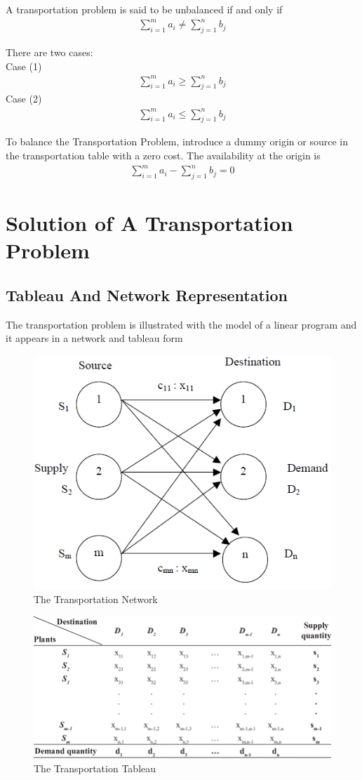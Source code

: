 \documentclass[12pt]{report}
\newcommand{\NI}{\noindent}
\newcommand{\tp}{Transportation Problem }
\newcommand{\stp}{transportation problem }
\begin{document}
	\NI A \stp is said to be unbalanced if and only if
	\begin{eqnarray}
		\sum_{i=1}^{m}a_i \neq \sum_{j=1}^{n}b_j\label{eq:3_5}
	\end{eqnarray} 
	
	\NI There are two cases:\\
	Case (1)
	\begin{eqnarray}
		\sum_{i=1}^{m}a_i \geq \sum_{j=1}^{n}b_j\label{eq:3_6}
	\end{eqnarray}
	Case (2)
	\begin{eqnarray}
		\sum_{i=1}^{m}a_i \leq \sum_{j=1}^{n}b_j\label{eq:3_7}
	\end{eqnarray}
	
	\NI To balance the Transportation Problem, introduce a dummy origin or source in the transportation table with a zero cost. The availability at the origin is
	\begin{eqnarray}
		\sum_{i=1}^{m}a_i - \sum_{j=1}^{n}b_j = 0 \label{eq:3_8}
	\end{eqnarray}
	
	\section{Solution of A \tp}
	\subsection{Tableau And Network Representation}
	The \stp is illustrated with the model of a linear program and it appears in a network and tableau form
	
	\begin{figure}[!h]
		\centering
		\includegraphics[width=0.62\linewidth]{tt}
		\caption{The Transportation Network}
		\label{fg:3_1}
	\end{figure}
	\begin{figure}[!h]
		\centering
		\includegraphics[width=0.65\linewidth]{tt1}
		\caption{The Transportation Tableau}
		\label{fg:3_2}
	\end{figure}
	
\end{document}
